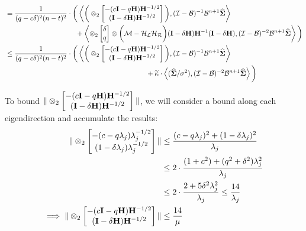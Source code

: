 \begin{align}
&=\frac{1}{(q-c\delta)^2(n-t)^2}\cdot\bigg(\left\langle \bigg(\otimes_{2}\begin{bmatrix}-(c\mathbf{I}-q\mathbf{H})\mathbf{H}^{-1/2}\\(\mathbf{I}-\delta\mathbf{H})\mathbf{H}^{-1/2}\end{bmatrix}\bigg), (\mathcal{I}-\mathcal{B})^{-1}\mathcal{B}^{n+1}\mathbf{\widehat{\Sigma}} \right\rangle\nonumber\\&\qquad \qquad\qquad \qquad \qquad  +\left\langle \otimes_2\begin{bmatrix}\delta\\q\end{bmatrix}\otimes\bigg(\mathcal{M}-\mathcal{H_L}\mathcal{H_R}\bigg)(\mathbf{I}-\delta\mathbf{H})\mathbf{H}^{-1}(\mathbf{I}-\delta\mathbf{H}), (\mathcal{I}-\mathcal{B})^{-2}\mathcal{B}^{n+1}\mathbf{\widehat{\Sigma}} \right\rangle\bigg)\nonumber\\
&\leq\frac{1}{(q-c\delta)^2(n-t)^2}\cdot\bigg(\left\langle \bigg(\otimes_{2}\begin{bmatrix}-(c\mathbf{I}-q\mathbf{H})\mathbf{H}^{-1/2}\\(\mathbf{I}-\delta\mathbf{H})\mathbf{H}^{-1/2}\end{bmatrix}\bigg), (\mathcal{I}-\mathcal{B})^{-1}\mathcal{B}^{n+1}\mathbf{\widehat{\Sigma}} \right\rangle\nonumber \nonumber\\&\qquad\qquad\qquad\qquad\qquad\qquad\qquad\qquad\qquad\qquad+\widetilde{\kappa}\cdot\left\langle (\mathbf{\widehat{\Sigma}}/\sigma^2), (\mathcal{I}-\mathcal{B})^{-2}\mathcal{B}^{n+1}\mathbf{\widehat{\Sigma}} \right\rangle\bigg)
\end{align}

To bound $\|\otimes_{2}\begin{bmatrix}-(c\mathbf{I}-q\mathbf{H})\mathbf{H}^{-1/2}\\(\mathbf{I}-\delta\mathbf{H})\mathbf{H}^{-1/2}\end{bmatrix}
\|$, we will consider a bound along each eigendirection and accumulate the results:
\begin{align*}
\|\otimes_{2}\begin{bmatrix}-(c-q\lambda_j)\lambda_j^{-1/2}\\(1-\delta\lambda_j)\lambda_j^{-1/2}\end{bmatrix}\|&\leq\frac{(c-q\lambda_j)^2+(1-\delta\lambda_j)^2}{\lambda_j}\\
&\leq2\cdot\frac{(1+c^2)+(q^2+\delta^2)\lambda_j^2}{\lambda_j}\\
&\leq2\cdot\frac{2+5\delta^2\lambda_j^2}{\lambda_j}\leq\frac{14}{\lambda_j}\\
\implies\|\otimes_{2}\begin{bmatrix}-(c\mathbf{I}-q\mathbf{H})\mathbf{H}^{-1/2}\\(\mathbf{I}-\delta\mathbf{H})\mathbf{H}^{-1/2}\end{bmatrix}
\|&\leq\frac{14}{\mu}
\end{align*}

